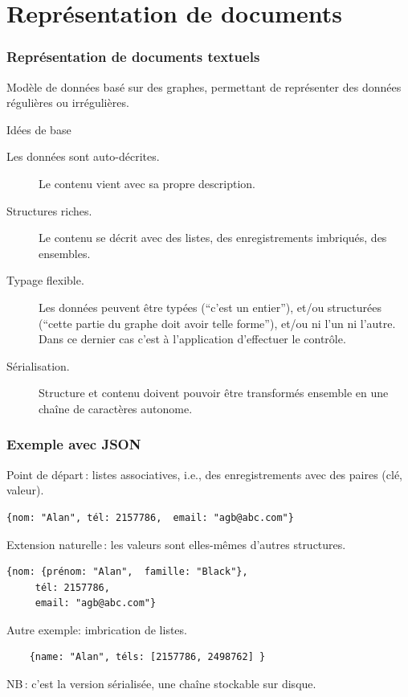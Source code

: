 

\section{Représentation de documents}

\begin{frame}
\frametitle{Représentation de documents textuels}

Modèle de données basé sur des \alert{graphes}, permettant de représenter des
données régulières ou irrégulières.

\vfill

\alert{Idées de base}

\begin{description}
  \item[Les données sont auto-décrites.] Le contenu vient avec sa propre
  description.
  
 \item[Structures riches.] Le contenu se décrit avec des listes, des
 enregistrements imbriqués, des ensembles.

  \item[Typage flexible.] Les données peuvent être typées (``c'est un entier''),
  et/ou structurées (``cette partie du graphe \alert{doit} avoir telle forme''), et/ou ni l'un ni
  l'autre. Dans ce dernier cas c'est à l'application d'effectuer le contrôle.
 
   \item[Sérialisation.] Structure \alert{et} contenu doivent pouvoir être transformés
      ensemble en une chaîne de caractères autonome.

\end{description}

\end{frame}

\begin{frame}[fragile]
\frametitle{Exemple avec JSON}

Point de départ\,: \alert{listes associatives},  i.e., des
enregistrements avec des paires (clé, valeur).

\begin{verbatim}
{nom: "Alan", tél: 2157786,  email: "agb@abc.com"}
\end{verbatim}

Extension naturelle\,: les valeurs sont elles-mêmes d'autres structures.

\begin{verbatim}
{nom: {prénom: "Alan",  famille: "Black"},
     tél: 2157786,
     email: "agb@abc.com"}
\end{verbatim}

Autre exemple: imbrication de listes.

\begin{verbatim}
    {name: "Alan", téls: [2157786, 2498762] }
\end{verbatim}

NB\,: c'est la version sérialisée, une chaîne stockable sur disque.
\end{frame}

